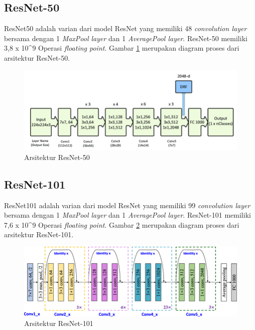 \subsection{ResNet-50}
\label{subsec:resnet50-definition}

ResNet50 adalah varian dari model ResNet yang memiliki 48 \textit{convolution layer} bersama dengan 1 \textit{MaxPool layer} dan 1 \textit{AveragePool layer}. ResNet-50 memiliki 3,8 x 10\^{}9 Operasi \textit{floating point}. Gambar \ref{fig:resnet50-arch} merupakan diagram proses dari arsitektur ResNet-50.
\begin{figure}[H]
	\centering
	\includegraphics[scale=0.25]{gambar/resnet50-arch.png}
	\caption{Arsitektur ResNet-50 \citep{resnet50-arch}}
	\label{fig:resnet50-arch}
\end{figure}

\subsection{ResNet-101}
\label{subsec:resnet101-definition}

ResNet101 adalah varian dari model ResNet yang memiliki 99 \textit{convolution layer} bersama dengan 1 \textit{MaxPool layer} dan 1 \textit{AveragePool layer}. ResNet-101 memiliki 7,6 x 10\^{}9 Operasi \textit{floating point}. Gambar \ref{fig:resnet101-arch} merupakan diagram proses dari arsitektur ResNet-101.
\begin{figure}[H]
	\centering
	\includegraphics[scale=0.25]{gambar/resnet101-arch.png}
	\caption{Arsitektur ResNet-101 \citep{resnet101-arch}}
	\label{fig:resnet101-arch}
\end{figure}

